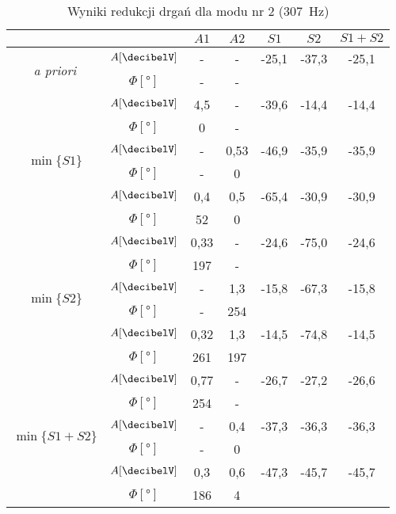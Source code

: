 \documentclass[polish,a4paper,11pt]{mwart}
\begin{document}
  \begin{table}[!tbh]
    \centering
    \caption{Wyniki redukcji drgań dla modu nr 2 (\SI{307}{\hertz})}
    \label{tab:red2}
    \begin{tabular}{|c|c|c|c|c|c|c|}
      \cline{3-7}
      \multicolumn{2}{c|}{}&$A1$&$A2$&$S1$&$S2$&$S1+S2$\\\hline
      \multirow{2}{*}{\textit{a priori}} & $A [\si{\decibelV}]$ & - & - & -25,1 & -37,3 & -25,1\\\cline{2-7}
					 & $\Phi [\si{\degree}]$ & - & - & \multicolumn{3}{c}{}\\\hline
      \multirow{6}{*}{$\min\{S1\}$}   &   $A [\si{\decibelV}]$ & 4,5 & - & -39,6 & -14,4 & -14,4\\\cline{2-7}
				      &$\Phi [\si{\degree}]$ & 0 & - & \multicolumn{3}{c}{}\\\cline{2-7}
				      &   $A [\si{\decibelV}]$ & - & 0,53 & -46,9 & -35,9 & -35,9\\\cline{2-7}
				      &$\Phi [\si{\degree}]$ & - & 0 & \multicolumn{3}{c}{}\\\cline{2-7}
				      &   $A [\si{\decibelV}]$ & 0,4 & 0,5 & -65,4 & -30,9 & -30,9\\\cline{2-7}
				      &$\Phi [\si{\degree}]$ & 52 & 0 & \multicolumn{3}{c}{}\\\hline
      \multirow{6}{*}{$\min\{S2\}$}   &   $A [\si{\decibelV}]$ & 0,33 & - & -24,6 & -75,0 & -24,6\\\cline{2-7}
				      &$\Phi [\si{\degree}]$ & 197 & - & \multicolumn{3}{c}{}\\\cline{2-7}
				      &   $A [\si{\decibelV}]$ & - & 1,3 & -15,8 & -67,3 & -15,8\\\cline{2-7}
				      &$\Phi [\si{\degree}]$ & - & 254 & \multicolumn{3}{c}{}\\\cline{2-7}
				      &   $A [\si{\decibelV}]$ & 0,32 & 1,3 & -14,5 & -74,8 & -14,5\\\cline{2-7}
				      &$\Phi [\si{\degree}]$ & 261 & 197 & \multicolumn{3}{c}{}\\\hline
      \multirow{6}{*}{$\min\{S1+S2\}$}&   $A [\si{\decibelV}]$ & 0,77 & - & -26,7 & -27,2 & -26,6\\\cline{2-7}
				      &$\Phi [\si{\degree}]$ & 254 & - & \multicolumn{3}{c}{}\\\cline{2-7}
				      &   $A [\si{\decibelV}]$ & - & 0,4 & -37,3 & -36,3 & -36,3\\\cline{2-7}
				      &$\Phi [\si{\degree}]$ & - & 0 & \multicolumn{3}{c}{}\\\cline{2-7}
				      &   $A [\si{\decibelV}]$ & 0,3 & 0,6 & -47,3 & -45,7 & -45,7\\\cline{2-7}
				      &$\Phi [\si{\degree}]$ & 186 & 4 & \multicolumn{3}{c}{}\\\cline{1-4}
    \end{tabular}
  \end{table}
\end{document}
